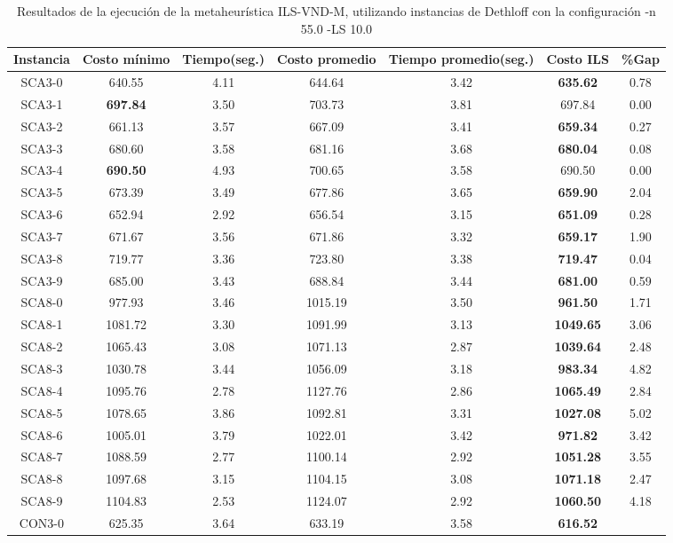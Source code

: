 \begin{table}[h]
\caption{Resultados de la ejecución de la metaheurística ILS-VND-M, utilizando instancias de Dethloff con la configuración -n 55.0 -LS 10.0}
\centering
\small
\begin{tabular}{c c c c c c c}
\hline\hline
Instancia & Costo mínimo & Tiempo(seg.) & Costo promedio & Tiempo promedio(seg.) & Costo ILS & \%Gap \\ [0.5ex]
\hline
SCA3-0 & 640.55 & 4.11 & 
644.64 & 3.42 & \bf{635.62} & 
0.78\\SCA3-1 & \bf{697.84} & 3.50 & 
703.73 & 3.81 & 697.84 & 0.00\\
SCA3-2 & 661.13 & 3.57 & 
667.09 & 3.41 & \bf{659.34} & 
0.27\\SCA3-3 & 680.60 & 3.58 & 
681.16 & 3.68 & \bf{680.04} & 
0.08\\SCA3-4 & \bf{690.50} & 4.93 & 
700.65 & 3.58 & 690.50 & 0.00\\
SCA3-5 & 673.39 & 3.49 & 
677.86 & 3.65 & \bf{659.90} & 
2.04\\SCA3-6 & 652.94 & 2.92 & 
656.54 & 3.15 & \bf{651.09} & 
0.28\\SCA3-7 & 671.67 & 3.56 & 
671.86 & 3.32 & \bf{659.17} & 
1.90\\SCA3-8 & 719.77 & 3.36 & 
723.80 & 3.38 & \bf{719.47} & 
0.04\\SCA3-9 & 685.00 & 3.43 & 
688.84 & 3.44 & \bf{681.00} & 
0.59\\SCA8-0 & 977.93 & 3.46 & 
1015.19 & 3.50 & \bf{961.50} & 
1.71\\SCA8-1 & 1081.72 & 3.30 & 
1091.99 & 3.13 & \bf{1049.65} & 
3.06\\SCA8-2 & 1065.43 & 3.08 & 
1071.13 & 2.87 & \bf{1039.64} & 
2.48\\SCA8-3 & 1030.78 & 3.44 & 
1056.09 & 3.18 & \bf{983.34} & 
4.82\\SCA8-4 & 1095.76 & 2.78 & 
1127.76 & 2.86 & \bf{1065.49} & 
2.84\\SCA8-5 & 1078.65 & 3.86 & 
1092.81 & 3.31 & \bf{1027.08} & 
5.02\\SCA8-6 & 1005.01 & 3.79 & 
1022.01 & 3.42 & \bf{971.82} & 
3.42\\SCA8-7 & 1088.59 & 2.77 & 
1100.14 & 2.92 & \bf{1051.28} & 
3.55\\SCA8-8 & 1097.68 & 3.15 & 
1104.15 & 3.08 & \bf{1071.18} & 
2.47\\SCA8-9 & 1104.83 & 2.53 & 
1124.07 & 2.92 & \bf{1060.50} & 
4.18\\CON3-0 & 625.35 & 3.64 & 
633.19 & 3.58 & \bf{616.52} & 

\end{tabular}
\end{table}
